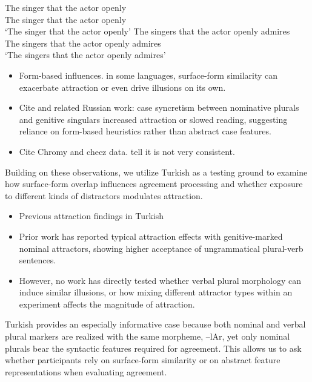 \documentclass[
  authoryear,
  preprint]{elsarticle}
\providecommand{\tightlist}{%
  \setlength{\itemsep}{0pt}\setlength{\parskip}{0pt}}
\begin{document}
\begin{exe}
\ex \label{rus}
\begin{xlist}
\ex \label{rus-gen-sg}
\gll The singer that the actor openly \\
The singer that the actor openly \\
\glt `The singer that the actor openly' 
\ex \label{rus-gen-pl}
\gll The singers that the actor openly admires \\
The singers that the actor openly admires \\
\glt `The singers that the actor openly admires'
\end{xlist}
\end{exe}

\begin{itemize}
\tightlist
\item
  Form-based influences. in some languages, surface-form similarity can
  exacerbate attraction or even drive illusions on its own.
\item
  Cite \citet{Slioussar2018} and related Russian work: case syncretism
  between nominative plurals and genitive singulars increased attraction
  or slowed reading, suggesting reliance on form-based heuristics rather
  than abstract case features.
\item
  Cite Chromy and checz data. tell it is not very consistent.
\end{itemize}

Building on these observations, we utilize Turkish as a testing ground
to examine how surface-form overlap influences agreement processing and
whether exposure to different kinds of distractors modulates attraction.

\begin{itemize}
\tightlist
\item
  Previous attraction findings in Turkish
\item
  Prior work has reported typical attraction effects with
  genitive-marked nominal attractors, showing higher acceptance of
  ungrammatical plural-verb sentences.
\item
  However, no work has directly tested whether verbal plural morphology
  can induce similar illusions, or how mixing different attractor types
  within an experiment affects the magnitude of attraction.
\end{itemize}

Turkish provides an especially informative case because both nominal and
verbal plural markers are realized with the same morpheme, --lAr, yet
only nominal plurals bear the syntactic features required for agreement.
This allows us to ask whether participants rely on surface-form
similarity or on abstract feature representations when evaluating
agreement.
\end{document}
